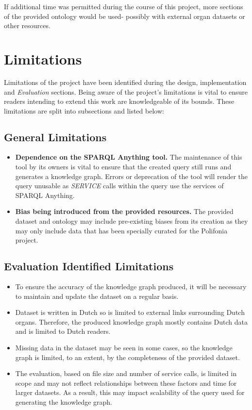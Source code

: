 If additional time was permitted during the course of this project, more sections of the provided ontology would be used- possibly with external organ datasets or other resources. 

\section{Limitations}
Limitations of the project have been identified during the design, implementation and \textit{Evaluation} sections. Being aware of the project's limitations is vital to ensure readers intending to extend this work are knowledgeable of its bounds. These limitations are split into subsections and listed below:

\subsection{General Limitations}
\begin{itemize}
    \item \textbf{Dependence on the SPARQL Anything tool.} The maintenance of this tool by its owners is vital to ensure that the created query still runs and generates a knowledge graph. Errors or deprecation of the tool will render the query unusable as \textit{SERVICE} calls within the query use the services of SPARQL Anything. 
    \item \textbf{Bias being introduced from the provided resources.} The provided dataset and ontology may include pre-existing biases from its creation as they may only include data that has been specially curated for the Polifonia project. 
\end{itemize}

\subsection{Evaluation Identified Limitations}
\begin{itemize}
    \item To ensure the accuracy of the knowledge graph produced, it will be necessary to maintain and update the dataset on a regular basis.
    \item Dataset is written in Dutch so is limited to external links surrounding Dutch organs. Therefore, the produced knowledge graph mostly contains Dutch data and is limited to Dutch readers.  
    \item Missing data in the dataset may be seen in some cases, so the knowledge graph is limited, to an extent, by the completeness of the provided dataset.
    \item  The evaluation, based on file size and number of service calls, is limited in scope and may not reflect relationships between these factors and time for larger datasets. As a result, this may impact scalability of the query used for generating the knowledge graph.
\end{itemize}

